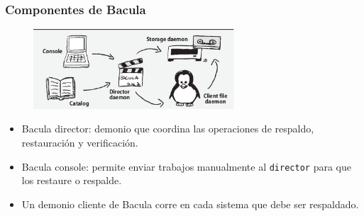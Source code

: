 \documentclass{beamer}
\begin{document}
\begin{frame}
  \frametitle{Componentes de Bacula}

\begin{figure}[h]
\begin{center}
  \includegraphics[width=7.5cm]{figs/bacula.png}
\end{center}
\end{figure}

  \begin{itemize}

    \item \alert{Bacula director}: demonio que coordina las operaciones de respaldo, restauración y verificación.
    \item \alert{Bacula console}: permite enviar trabajos manualmente al \texttt{director} para que los restaure o respalde. 
    \item Un \alert{demonio cliente de Bacula} corre en cada sistema que debe ser respaldado.
  \end{itemize}

\end{frame}




\end{document}
